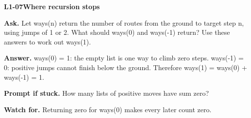 \documentclass[11pt,a4paper]{article}
\begin{document}
\noindent\begin{minipage}{\textwidth}
{\color{teal}\textbf{L1-07}}\quad \textbf{Where recursion stops}\par\smallskip
\textbf{Ask.} Let ways(n) return the number of routes from the ground to target step n, using jumps of 1 or 2. What should ways(0) and ways(-1) return? Use these answers to work out ways(1).\par\smallskip
\textbf{Answer.} ways(0) = 1: the empty list is one way to climb zero steps. ways(-1) = 0: positive jumps cannot finish below the ground. Therefore ways(1) = ways(0) + ways(-1) = 1.\par\smallskip
\textbf{Prompt if stuck.} How many lists of positive moves have sum zero?\par\smallskip
\textbf{Watch for.} Returning zero for ways(0) makes every later count zero.
\end{minipage}\par{}\medskip
\end{document}
